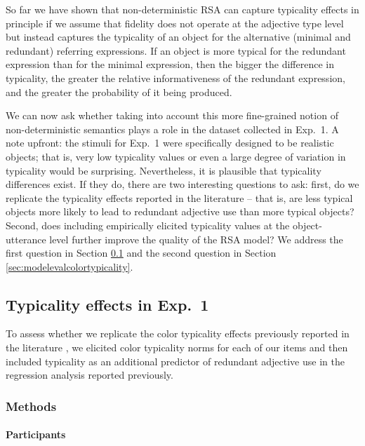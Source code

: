 \documentclass[11pt]{article}
\newcommand{\appref}[1]{Appendix \ref{#1}}
\newcommand{\sectionref}[1]{Section \ref{#1}}
\begin{document}
So far we have shown that non-deterministic RSA can capture typicality effects in principle if we assume that fidelity does not operate at the adjective type level but instead captures the typicality of an object for the alternative (minimal and redundant) referring expressions. If an object is more typical for the redundant expression than for the minimal expression, then the bigger the difference in typicality, the greater the relative informativeness of the redundant expression, and the greater the probability of it being produced.

We can now ask whether taking into account this more fine-grained notion of non-deterministic semantics plays a role in the dataset collected in Exp.~1. 
A note upfront: the stimuli for Exp.~1 were specifically designed to be realistic objects; that is, very low typicality values or even a large degree of variation in typicality would be surprising. Nevertheless, it is plausible that typicality differences exist. If they do, there are two interesting questions to ask: first, do we replicate the typicality effects reported in the literature -- that is, are less typical objects more likely to lead to redundant adjective use than more typical objects? Second, does including empirically elicited typicality values at the object-utterance level further improve the quality of the RSA model? We address the first question in \sectionref{sec:modifiertypicalityeffects} and the second question in \sectionref{sec:modelevalcolortypicality}.

\subsection{Typicality effects in Exp.~1}
\label{sec:modifiertypicalityeffects}

To assess whether we replicate the color typicality effects previously reported in the literature \cite{sedivy2003a, Westerbeek2015, rubiofernandez2016}, we elicited color typicality norms for each of our items and then included typicality as an additional predictor of redundant adjective use in the regression analysis reported previously. 

\subsubsection{Methods}

\paragraph{Participants}
\end{document}
